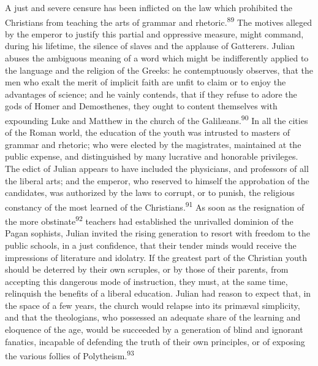 A just and severe censure has been inflicted on the law which
prohibited the Christians from teaching the arts of grammar and
rhetoric.\textsuperscript{89} The motives alleged by the emperor to justify this
partial and oppressive measure, might command, during his
lifetime, the silence of slaves and the applause of Gatterers.
Julian abuses the ambiguous meaning of a word which might be
indifferently applied to the language and the religion of the
Greeks: he contemptuously observes, that the men who exalt the
merit of implicit faith are unfit to claim or to enjoy the
advantages of science; and he vainly contends, that if they
refuse to adore the gods of Homer and Demosthenes, they ought to
content themselves with expounding Luke and Matthew in the church
of the Galilæans.\textsuperscript{90} In all the cities of the Roman world, the
education of the youth was intrusted to masters of grammar and
rhetoric; who were elected by the magistrates, maintained at the
public expense, and distinguished by many lucrative and honorable
privileges. The edict of Julian appears to have included the
physicians, and professors of all the liberal arts; and the
emperor, who reserved to himself the approbation of the
candidates, was authorized by the laws to corrupt, or to punish,
the religious constancy of the most learned of the Christians.\textsuperscript{91}
As soon as the resignation of the more obstinate\textsuperscript{92} teachers had
established the unrivalled dominion of the Pagan sophists, Julian
invited the rising generation to resort with freedom to the
public schools, in a just confidence, that their tender minds
would receive the impressions of literature and idolatry. If the
greatest part of the Christian youth should be deterred by their
own scruples, or by those of their parents, from accepting this
dangerous mode of instruction, they must, at the same time,
relinquish the benefits of a liberal education. Julian had reason
to expect that, in the space of a few years, the church would
relapse into its primæval simplicity, and that the theologians,
who possessed an adequate share of the learning and eloquence of
the age, would be succeeded by a generation of blind and ignorant
fanatics, incapable of defending the truth of their own
principles, or of exposing the various follies of Polytheism.\textsuperscript{93}



